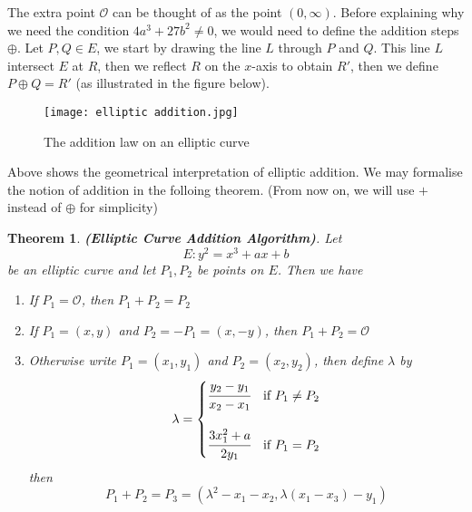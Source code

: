 \documentclass[a4 paper]{article}
\newcommand{\?}{\stackrel{?}{=}}
\newtheorem{theorem}{Theorem}[section]
\begin{document}
The extra point $ \mathcal{O} $ can be thought of as the point $ (0, \infty) $. Before explaining why we need the condition $ 4a^3 + 27b^2 \neq 0 $, we would need to define the addition steps $ \oplus $. Let $ P , Q \in E $, we start by drawing the line $ L $ through $ P  $ and $ Q $. This line $ L $ intersect $ E $ at $ R $, then we reflect $ R $ on the $ x $-axis to obtain $ R' $, then we define  $ P \oplus Q = R'  $ (as illustrated in the figure below). 

\begin{figure}[H]
    \centering
    \texttt{[image: elliptic addition.jpg]}
    \caption{The addition law on an elliptic curve \cite[p.281]{hoffstein2008introduction}\label{e_add}}
\end{figure}
Above shows the geometrical interpretation of elliptic addition. We may formalise the notion of addition in the folloing theorem. (From now on, we will use $ + $ instead of $ \oplus $ for simplicity)

\begin{tcolorbox}
\begin{theorem}
\textbf{(Elliptic Curve Addition Algorithm)}. Let  
$$ E : y^2 = x^3 + ax + b $$
be an elliptic curve and let $ P_1 , P_2  $ be points on $ E $. Then we have 
\begin{enumerate}
    \item If $ P_1 = \mathcal{O}  $, then $ P_1 + P_2 = P_2  $
    \item If $ P_1 = (x, y ) $ and $ P_2 = - P_1 = (x, -y)  $, then $ P_1 + P_2 = \mathcal{O} $ 
    \item Otherwise write $ P_1 = (x_1 , y_1 ) $ and $ P_2 = (x_2 , y_2 ) $, then define $ \lambda  $ by 
    $$ \lambda = \begin{cases}
        \cfrac{y_2 - y_1 }{ x_2 - x_1 }  & \text{if } P_1 \neq P_2  \\ 
         & \\
        \cfrac{3 x_1 ^2  + a }{ 2 y_1 }  & \text{if } P_1 = P_2 
    \end{cases} $$
    then 
    $$ P_1 + P_2 = P_3 = (\lambda^2 -x_1 -x_2, \lambda (x_1 - x_3 ) - y_1 ) $$
\end{enumerate}

\end{theorem}
\end{tcolorbox}
\end{document}
